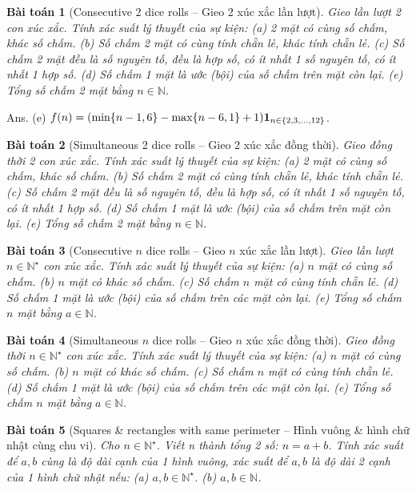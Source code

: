 \documentclass[oneside]{book}
\newtheorem{baitoan}{Bài toán}
\begin{document}
\begin{baitoan}[Consecutive 2 dice rolls -- Gieo 2 xúc xắc lần lượt]
	Gieo lần lượt 2 con xúc xắc. Tính xác suất lý thuyết của sự kiện: (a) 2 mặt có cùng số chấm, khác số chấm. (b) Số chấm 2 mặt có cùng tính chẵn lẻ, khác tính chẵn lẻ. (c) Số chấm 2 mặt đều là số nguyên tố, đều là hợp số, có ít nhất 1 số nguyên tố, có ít nhất 1 hợp số. (d) Số chấm 1 mặt là ước (bội) của số chấm trên mặt còn lại. (e) Tổng số chấm 2 mặt bằng $n\in\mathbb{N}$.
\end{baitoan}
{\sf Ans.} (e) $f(n) = (\min\{n - 1, 6\} - \max\{n - 6,1\} + 1){\bf1}_{n\in\{2,3,\ldots,12\}}$.

\begin{baitoan}[Simultaneous 2 dice rolls -- Gieo 2 xúc xắc đồng thời]
	Gieo đồng thời 2 con xúc xắc. Tính xác suất lý thuyết của sự kiện: (a) 2 mặt có cùng số chấm, khác số chấm. (b) Số chấm 2 mặt có cùng tính chẵn lẻ, khác tính chẵn lẻ. (c) Số chấm 2 mặt đều là số nguyên tố, đều là hợp số, có ít nhất 1 số nguyên tố, có ít nhất 1 hợp số. (d) Số chấm 1 mặt là ước (bội) của số chấm trên mặt còn lại. (e) Tổng số chấm 2 mặt bằng $n\in\mathbb{N}$.
\end{baitoan}

\begin{baitoan}[Consecutive $n$ dice rolls -- Gieo $n$ xúc xắc lần lượt]
	Gieo lần lượt $n\in\mathbb{N}^\star$ con xúc xắc. Tính xác suất lý thuyết của sự kiện: (a) $n$ mặt có cùng số chấm. (b) $n$ mặt có khác số chấm. (c) Số chấm $n$ mặt có cùng tính chẵn lẻ. (d) Số chấm 1 mặt là ước (bội) của số chấm trên các mặt còn lại. (e) Tổng số chấm $n$ mặt bằng $a\in\mathbb{N}$.
\end{baitoan}

\begin{baitoan}[Simultaneous $n$ dice rolls -- Gieo $n$ xúc xắc đồng thời]
	Gieo đồng thời $n\in\mathbb{N}^\star$ con xúc xắc. Tính xác suất lý thuyết của sự kiện: (a) $n$ mặt có cùng số chấm. (b) $n$ mặt có khác số chấm. (c) Số chấm $n$ mặt có cùng tính chẵn lẻ. (d) Số chấm 1 mặt là ước (bội) của số chấm trên các mặt còn lại. (e) Tổng số chấm $n$ mặt bằng $a\in\mathbb{N}$.
\end{baitoan}

\begin{baitoan}[Squares \& rectangles with same perimeter -- Hình vuông \& hình chữ nhật cùng chu vi]
	Cho $n\in\mathbb{N}^\star$. Viết n thành tổng 2 số: $n = a + b$. Tính xác suất để $a,b$ cùng là độ dài cạnh của 1 hình vuông, xác suất để $a,b$ là độ dài 2 cạnh của 1 hình chữ nhật nếu: (a) $a,b\in\mathbb{N}^\star$. (b) $a,b\in\mathbb{N}$.
\end{baitoan}
\end{document}
